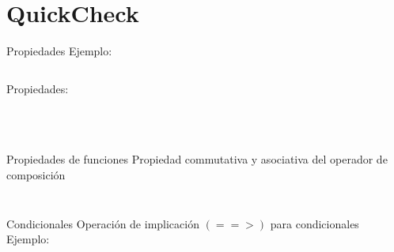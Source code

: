 \documentclass[10pt]{beamer}
\newcommand\Fontvi{\fontsize{10}{12}\selectfont}
\begin{document}
\section{QuickCheck}

\begin{frame}{Propiedades}
  Ejemplo:
  \inputminted{text}{data/reverse.hs}
  Propiedades:
  \inputminted{haskell}{data/reverse_prop.hs}
\end{frame}


\begin{frame}[standout]
  \Fontvi
  \inputminted{text}{data/pruebas_rev.txt}
\end{frame}


\begin{frame}[standout]
  \Fontvi
  \inputminted{text}{data/reverse_prop_pruebas_verb.txt}
\end{frame}

\begin{frame}[standout]
  \Fontvi
  \inputminted{text}{data/reverse_prop_pruebas_verb1.txt}
\end{frame}

%

\begin{frame}{Propiedades de funciones}
  Propiedad commutativa y asociativa del operador de composición
  \inputminted{haskell}{data/func_prop.hs}
\end{frame}

\begin{frame}[standout]
  \Fontvi
  \inputminted{text}{data/pruebas_func.txt}
\end{frame}

\begin{frame}{Condicionales}
  Operación de implicación $(==>)$ para condicionales
  Ejemplo:
  \inputminted{haskell}{data/max_prop.hs}
\end{frame}
\end{document}
